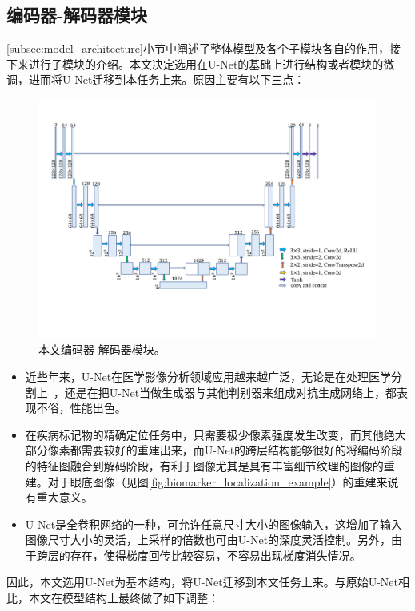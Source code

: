 \subsection{编码器-解码器模块}\label{subsec:encoder_decoder_model}
\ref{subsec:model_architecture}小节中阐述了整体模型及各个子模块各自的作用，接下来进行子模块的介绍。本文决定选用在U-Net的基础上进行结构或者模块的微调，进而将U-Net迁移到本任务上来。原因主要有以下三点：
\begin{figure}[h]
	\centering
	\includegraphics[width=1.0\textwidth]{figure/auto_encoder_architecture}
	\caption[本文编码器-解码器模块]{本文编码器-解码器模块。}
	\label{fig:auto_encoder_architecture}
\end{figure}
\begin{itemize}
	\item 近些年来，U-Net在医学影像分析领域应用越来越广泛，无论是在处理医学分割上~\cite{oktay2018attention, dong2017automatic, zhang2018ct}，还是在把U-Net当做生成器与其他判别器来组成对抗生成网络上，都表现不俗，性能出色。
	\item 在疾病标记物的精确定位任务中，只需要极少像素强度发生改变，而其他绝大部分像素都需要较好的重建出来，而U-Net的跨层结构能够很好的将编码阶段的特征图融合到解码阶段，有利于图像尤其是具有丰富细节纹理的图像的重建。对于眼底图像（见图\ref{fig:biomarker_localization_example}）的重建来说有重大意义。
	\item U-Net是全卷积网络的一种，可允许任意尺寸大小的图像输入，这增加了输入图像尺寸大小的灵活，上采样的倍数也可由U-Net的深度灵活控制。另外，由于跨层的存在，使得梯度回传比较容易，不容易出现梯度消失情况。
\end{itemize}
因此，本文选用U-Net为基本结构，将U-Net迁移到本文任务上来。与原始U-Net相比，本文在模型结构上最终做了如下调整：
